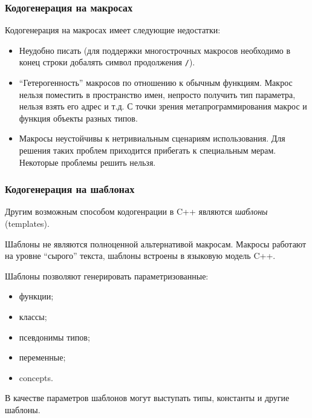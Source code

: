 \documentclass[compress, 8pt, aspectratio=169]{beamer}
\begin{document}
  \begin{frame}[fragile]

    \frametitle{Кодогенерация на макросах}

    Кодогенерация на макросах имеет следующие недостатки:

    \begin{itemize}
      \item Неудобно писать (для поддержки многострочных макросов
        необходимо в конец строки добалять символ продолжения
        \verb|/|).
      \item \enquote{Гетерогенность} макросов по отношению
        к обычным функциям.
        Макрос нельзя поместить в пространство имен,
        непросто получить тип параметра,
        нельзя взять его адрес и т.д.
        С точки зрения метапрограммирования макрос и функция
        \textemdash \space объекты разных типов.
      \item Макросы неустойчивы к нетривиальным сценариям
        использования.
        Для решения таких проблем приходится прибегать к
        специальным мерам.
        Некоторые проблемы решить нельзя.
    \end{itemize}

  \end{frame}

  \begin{frame}[fragile]

    \frametitle{Кодогенерация на шаблонах}

    Другим возможным способом кодогенрации в C++ являются
    \textit{шаблоны}\footnotemark{} (templates).


    \hfill \break
    Шаблоны не являются полноценной альтернативой макросам.
    Макросы работают на уровне \enquote{сырого} текста, шаблоны
    \textemdash \space встроены в языковую модель C++.

    \hfill \break
    Шаблоны позволяют генерировать параметризованные:
    \begin{itemize}
      \item функции;
      \item классы;
      \item псевдонимы типов;
      \item переменные;
      \item concepts.
    \end{itemize}

    \hfill \break
    В качестве параметров шаблонов могут выступать типы, константы и
    другие шаблоны.

  \end{frame}
\end{document}
